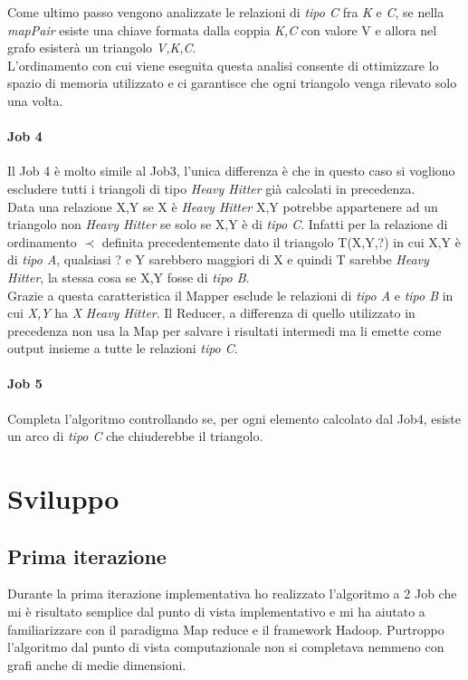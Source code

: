 \documentclass[paper=a4, fontsize=11pt]{scrartcl}	%
\numberwithin{equation}{section}															%
\numberwithin{figure}{section}																%
\numberwithin{table}{section}																%
\begin{document}
Come ultimo passo vengono analizzate le relazioni di \textit{tipo C} fra \textit{K} e \textit{C}, se nella \textit{mapPair} esiste una chiave formata dalla coppia  \textit{K,C} con valore V e allora nel grafo esisterà un triangolo \textit{V,K,C}.\\
L'ordinamento con cui viene eseguita questa analisi consente di ottimizzare lo spazio di memoria utilizzato e ci garantisce che ogni triangolo venga rilevato solo una volta.
\paragraph{Job 4}
Il Job 4 è molto simile al Job3, l'unica differenza è che in questo caso si vogliono escludere tutti i triangoli di tipo \textit{Heavy Hitter} già calcolati in precedenza.\\
Data una relazione X,Y se X è \textit{Heavy Hitter} X,Y potrebbe appartenere ad un triangolo non \textit{Heavy Hitter} se solo se X,Y è di \textit{tipo C}. Infatti per la relazione di ordinamento $\prec$ definita precedentemente dato il triangolo T(X,Y,?) in cui X,Y è di \textit{tipo A}, qualsiasi ? e Y sarebbero maggiori di X e quindi T sarebbe \textit{Heavy Hitter}, la stessa cosa se X,Y fosse di \textit{tipo B}.\\
Grazie a questa caratteristica il Mapper esclude le relazioni di \textit{tipo A} e \textit{tipo B} in cui \textit{X,Y} ha \textit{X} \textit{Heavy Hitter}.
Il Reducer, a differenza di quello utilizzato in precedenza non usa la Map per salvare i risultati intermedi ma li emette come output insieme a tutte le relazioni \textit{tipo C}.
\paragraph{Job 5}
Completa l'algoritmo controllando se, per ogni elemento calcolato dal Job4, esiste un arco di \textit{tipo C} che chiuderebbe il triangolo.
\section{Sviluppo}
\subsection{Prima iterazione} 
Durante la prima iterazione implementativa ho realizzato l'algoritmo a 2 Job che mi è risultato semplice dal punto di vista implementativo e mi ha aiutato a familiarizzare con il paradigma Map reduce e il framework Hadoop. Purtroppo l'algoritmo dal punto di vista computazionale non si completava nemmeno con grafi anche di medie dimensioni.
\end{document}
